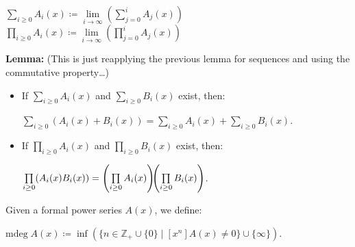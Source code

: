 \documentclass{book}
\newcommand{\hTwo}{%
\color{MidnightBlue}%
   \fontsize{13}{15}\selectfont%
}
\newcommand{\hThree}{%
   \color{PineGreen!85!Orange}
   \fontsize{12}{14}\selectfont%
}
\newenvironment{myIndent}{%
   \begin{adjustwidth}{2.5em}{0em}%
}{%
   \end{adjustwidth}%
}
\newcommand{\blab}[1]{\textbf{#1}}
\newcommand{\mdeg}{\mathrm{mdeg}\phantom{.}}
\newcommand{\retTwo}{\hfill\bigbreak}
\begin{document}
\begin{myIndent}
   $\sum\limits_{i \geq 0} A_i(x) \coloneq \lim\limits_{i \rightarrow \infty} (\sum\limits_{j = 0}^i A_j(x))$\\

   $\prod\limits_{i \geq 0} A_i(x) \coloneq \lim\limits_{i \rightarrow \infty}(\prod\limits_{j = 0}^i A_j(x))$\retTwo

   \hTwo\blab{Lemma:} {\hThree (This is just reapplying the previous lemma for sequences and using the\\ \phantom{aaaaaaaaaaaaaaaaaaaaaaaaaaaaaaaaaaaaaaaaaaaaaaaaa} commutative property\dots)}
   \begin{itemize}
      \item If $\sum\limits_{i \geq 0}A_i(x)$ and $\sum\limits_{i \geq 0}B_i(x)$ exist, then:
      
      {\centering $\sum\limits_{i \geq 0}(A_i(x) + B_i(x)) = \sum\limits_{i \geq 0}A_i(x) + \sum\limits_{i \geq 0}B_i(x)$.\retTwo\par}
   
      \item If $\prod\limits_{i \geq 0}A_i(x)$ and $\prod\limits_{i \geq 0}B_i(x)$ exist, then:\\ [-13pt]
      
      {\centering$\prod\limits_{i \geq 0}(A_i(x)B_i(x)) = \left(\prod\limits_{i \geq 0}A_i(x)\right)\hspace{-0.4em}\left(\prod\limits_{i \geq 0}B_i(x)\right)$.\newpage\par}
   \end{itemize}
\end{myIndent}

Given a formal power series $A(x)$, we define:

{\centering $\mdeg A(x) \coloneq \inf(\{n \in \mathbb{Z}_+ \cup \{0\} \mid [x^n]A(x) \neq 0\} \cup \{\infty\})$.\retTwo\par}
\end{document}
